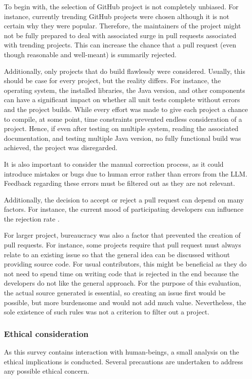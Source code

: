 To begin with, the selection of GitHub project is not completely unbiased. For instance, currently trending GitHub projects were chosen although it is not certain why they were popular. Therefore, the maintainers of the project might not be fully prepared to deal with associated surge in pull requests associated with trending projects. This can increase the chance that a pull request (even though reasonable and well-meant) is summarily rejected. \cite{10.1145/3366423.3380272}

Additionally, only projects that do build flawlessly were considered. Usually, this should be case for every project, but the reality differs. For instance, the operating system, the installed libraries, the Java version, and other components can have a significant impact on whether all unit tests complete without errors and the project builds.  While every effort was made to give each project a chance to compile, at some point, time constraints prevented endless consideration of a project. Hence, if even after testing on multiple system, reading the associated documentation, and testing multiple Java version, no fully functional build was achieved, the project was disregarded.

It is also important to consider the manual correction process, as it could introduce mistakes or bugs due to human error rather than errors from the \ac{LLM}. Feedback regarding these errors must be filtered out as they are not relevant. 


Additionally, the decision to accept or reject a pull request can depend on many factors. For instance, the current mood of participating developers can influence the rejection rate \cite{detecting_emotional}.

For larger project, bureaucracy was also a factor that prevented the creation of pull requests. For instance, some projects require that pull request must always relate to an existing issue so that the general idea can be discussed without providing source code. For usual contributors, this might be beneficial as they do not need to spend time on writing code that is rejected in the end because the developers do not like the general approach. For the purpose of this evaluation, the actual source generated is essential, so creating an issue first would be possible,  but more burdensome  and would not add much value. Nevertheless, the sole existence of such rules was not a criterion to filter out a project. 

\subsubsection{Ethical consideration}
As this survey contains interaction with human-beings, a small analysis on the ethical implications is conducted. Several precautions are undertaken to address any possible ethical concern. 

